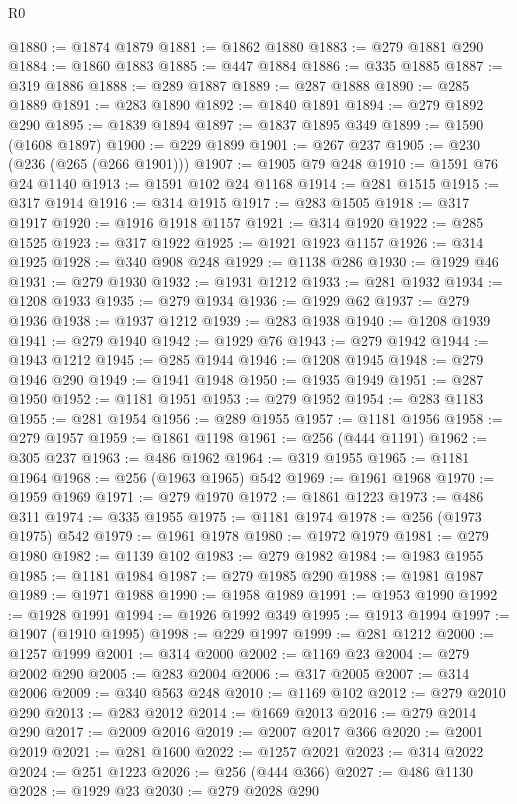 \begin{lexlean}{R0}
\begin{coremodule}
@1880 := @1874 @1879
@1881 := @1862 @1880
@1883 := @279 @1881 @290
@1884 := @1860 @1883
@1885 := @447 @1884
@1886 := @335 @1885
@1887 := @319 @1886
@1888 := @289 @1887
@1889 := @287 @1888
@1890 := @285 @1889
@1891 := @283 @1890
@1892 := @1840 @1891
@1894 := @279 @1892 @290
@1895 := @1839 @1894
@1897 := @1837 @1895 @349
@1899 := @1590 (@1608 @1897)
@1900 := @229 @1899
@1901 := @267 @237
@1905 := @230 (@236 (@265 (@266 @1901)))
@1907 := @1905 @79 @248
@1910 := @1591 @76 @24 @1140
@1913 := @1591 @102 @24 @1168
@1914 := @281 @1515
@1915 := @317 @1914
@1916 := @314 @1915
@1917 := @283 @1505
@1918 := @317 @1917
@1920 := @1916 @1918 @1157
@1921 := @314 @1920
@1922 := @285 @1525
@1923 := @317 @1922
@1925 := @1921 @1923 @1157
@1926 := @314 @1925
@1928 := @340 @908 @248
@1929 := @1138 @286
@1930 := @1929 @46
@1931 := @279 @1930
@1932 := @1931 @1212
@1933 := @281 @1932
@1934 := @1208 @1933
@1935 := @279 @1934
@1936 := @1929 @62
@1937 := @279 @1936
@1938 := @1937 @1212
@1939 := @283 @1938
@1940 := @1208 @1939
@1941 := @279 @1940
@1942 := @1929 @76
@1943 := @279 @1942
@1944 := @1943 @1212
@1945 := @285 @1944
@1946 := @1208 @1945
@1948 := @279 @1946 @290
@1949 := @1941 @1948
@1950 := @1935 @1949
@1951 := @287 @1950
@1952 := @1181 @1951
@1953 := @279 @1952
@1954 := @283 @1183
@1955 := @281 @1954
@1956 := @289 @1955
@1957 := @1181 @1956
@1958 := @279 @1957
@1959 := @1861 @1198
@1961 := @256 (@444 @1191)
@1962 := @305 @237
@1963 := @486 @1962
@1964 := @319 @1955
@1965 := @1181 @1964
@1968 := @256 (@1963 @1965) @542
@1969 := @1961 @1968
@1970 := @1959 @1969
@1971 := @279 @1970
@1972 := @1861 @1223
@1973 := @486 @311
@1974 := @335 @1955
@1975 := @1181 @1974
@1978 := @256 (@1973 @1975) @542
@1979 := @1961 @1978
@1980 := @1972 @1979
@1981 := @279 @1980
@1982 := @1139 @102
@1983 := @279 @1982
@1984 := @1983 @1955
@1985 := @1181 @1984
@1987 := @279 @1985 @290
@1988 := @1981 @1987
@1989 := @1971 @1988
@1990 := @1958 @1989
@1991 := @1953 @1990
@1992 := @1928 @1991
@1994 := @1926 @1992 @349
@1995 := @1913 @1994
@1997 := @1907 (@1910 @1995)
@1998 := @229 @1997
@1999 := @281 @1212
@2000 := @1257 @1999
@2001 := @314 @2000
@2002 := @1169 @23
@2004 := @279 @2002 @290
@2005 := @283 @2004
@2006 := @317 @2005
@2007 := @314 @2006
@2009 := @340 @563 @248
@2010 := @1169 @102
@2012 := @279 @2010 @290
@2013 := @283 @2012
@2014 := @1669 @2013
@2016 := @279 @2014 @290
@2017 := @2009 @2016
@2019 := @2007 @2017 @366
@2020 := @2001 @2019
@2021 := @281 @1600
@2022 := @1257 @2021
@2023 := @314 @2022
@2024 := @251 @1223
@2026 := @256 (@444 @366)
@2027 := @486 @1130
@2028 := @1929 @23
@2030 := @279 @2028 @290

\end{coremodule}
\end{lexlean}
